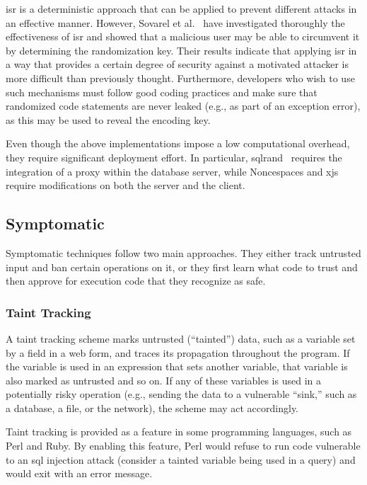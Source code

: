 \documentclass[10pt,journal,compsoc]{IEEEtran}
\begin{document}
{\sc isr} is a deterministic approach that can be applied to prevent
different attacks in an effective manner. However, Sovarel et
al.~\cite{SEP05} have investigated thoroughly the effectiveness of
{\sc isr} and showed that a malicious user may be able to circumvent
it by determining the randomization key. Their results indicate
that applying {\sc isr} in a way that provides a certain degree of
security against a motivated attacker is more difficult than
previously thought. Furthermore, developers who wish to use such
mechanisms must follow good coding practices and make sure that
randomized code statements are never leaked
(e.g., as part of an exception error),
as this may be used to reveal the encoding key.

Even though the above implementations impose a low computational
overhead, they require significant deployment effort. In particular,
{\sc sql}rand~\cite{BK04} requires the integration of
a proxy within the database
server, while Noncespaces and x{\sc js}~\cite{APKLM10}
require modifications on both the server and the client.

\vspace{-0.3mm}
\subsection{Symptomatic}
\vspace{-0.8mm}

Symptomatic techniques follow two main approaches. They either track
untrusted input and ban certain operations on it, or they first learn what
code to trust and then approve for execution code that they recognize
as safe.

\subsubsection{Taint Tracking}
\label{sec:taint}
\vspace{-0.3mm}

A taint tracking scheme marks untrusted (``tainted'') data, such as
a variable set by a field in a web form, and traces its propagation
throughout the program. If the variable is used in an expression that
sets another variable, that variable is also marked as untrusted and
so on. If any of these variables is used in a potentially risky
operation (e.g., sending the data to a vulnerable ``sink,'' such as
a database, a file, or the network), the scheme may act accordingly.

Taint tracking is provided as a feature in some programming languages,
such as Perl and Ruby. By enabling this feature, Perl would refuse to
run code vulnerable to an {\sc sql} injection attack (consider a
tainted variable being used in a query) and would exit with an error
message.
\end{document}
